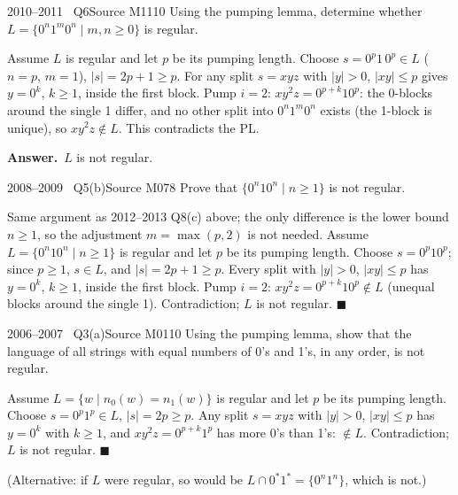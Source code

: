 \documentclass[11pt,a4paper]{article}
\newcommand{\ans}[1]{\par\smallskip\noindent\colorbox{mist}{\parbox{\dimexpr\linewidth-2\fboxsep}{\sffamily\small\textbf{\color{teal}Answer.}\ \color{ink}#1}}\par}
\begin{document}
\begin{question}{2010--2011 \textbullet\ Q6}{Source M11}{10}
Using the pumping lemma, determine whether $L=\{0^n1^m0^n\mid m,n\ge0\}$ is regular.
\end{question}
\begin{solution}
Assume $L$ is regular and let $p$ be its pumping length. Choose $s=0^p1\,0^p\in L$ ($n=p$, $m=1$), $|s|=2p+1\ge p$. For any split $s=xyz$ with $|y|>0$, $|xy|\le p$ gives $y=0^k$, $k\ge1$, inside the first block. Pump $i=2$: $xy^2z=0^{p+k}10^p$: the 0-blocks around the single 1 differ, and no other split into $0^{n}1^{m}0^{n}$ exists (the 1-block is unique), so $xy^2z\notin L$. This contradicts the PL.
\ans{$L$ is not regular.}
\end{solution}

\begin{question}{2008--2009 \textbullet\ Q5(b)}{Source M07}{8}
Prove that $\{0^n10^n\mid n\ge1\}$ is not regular.
\end{question}
\begin{solution}
Same argument as 2012--2013 Q8(c) above; the only difference is the lower bound $n\ge1$, so the adjustment $m=\max(p,2)$ is not needed. Assume $L=\{0^n10^n\mid n\ge1\}$ is regular and let $p$ be its pumping length. Choose $s=0^p10^p$; since $p\ge1$, $s\in L$, and $|s|=2p+1\ge p$. Every split with $|y|>0$, $|xy|\le p$ has $y=0^k$, $k\ge1$, inside the first block. Pump $i=2$: $xy^2z=0^{p+k}10^p\notin L$ (unequal blocks around the single 1). Contradiction; $L$ is not regular. \hfill$\blacksquare$
\end{solution}

\begin{question}{2006--2007 \textbullet\ Q3(a)}{Source M01}{10}
Using the pumping lemma, show that the language of all strings with equal numbers of 0's and 1's, in any order, is not regular.
\end{question}
\begin{solution}
Assume $L=\{w\mid n_0(w)=n_1(w)\}$ is regular and let $p$ be its pumping length. Choose $s=0^p1^p\in L$, $|s|=2p\ge p$. Any split $s=xyz$ with $|y|>0$, $|xy|\le p$ has $y=0^k$ with $k\ge1$, and $xy^2z=0^{p+k}1^p$ has more 0's than 1's: $\notin L$. Contradiction; $L$ is not regular. \hfill$\blacksquare$

(Alternative: if $L$ were regular, so would be $L\cap0^*1^*=\{0^n1^n\}$, which is not.)
\end{solution}
\end{document}

